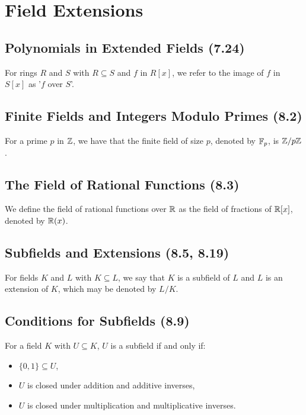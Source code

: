 \section{Field Extensions}

\subsection{Polynomials in Extended Fields (7.24)} \label{7.24}

For rings $R$ and $S$ with $R \subseteq S$ and $f$ in $R[x]$, we refer
to the image of $f$ in $S[x]$ as '$f$ over $S$'.

\subsection{Finite Fields and Integers Modulo Primes (8.2)} \label{8.2}

For a prime $p$ in $\mathbb{Z}$, we have that the finite field of
size $p$, denoted by $\mathbb{F}_p$, is $\mathbb{Z}/p\mathbb{Z}$.

\subsection{The Field of Rational Functions (8.3)} \label{8.3}

We define the field of rational functions over $\mathbb{R}$ as the field of
fractions of $\mathbb{R}[x]$, denoted by $\mathbb{R}(x)$.

\subsection{Subfields and Extensions (8.5, 8.19)} \label{8.5} \label{8.19}

For fields $K$ and $L$ with $K \subseteq L$, we say that $K$ is a
subfield of $L$ and $L$ is an extension of $K$, which may be
denoted by $L / K$.

\subsection{Conditions for Subfields (8.9)} \label{8.9}

For a field $K$ with $U \subseteq K$, $U$ is a subfield if and only if: 
\begin{itemize}
    \item $\{0, 1\} \subseteq U$,
    \item $U$ is closed under addition and additive inverses,
    \item $U$ is closed under multiplication and multiplicative inverses. 
\end{itemize}

